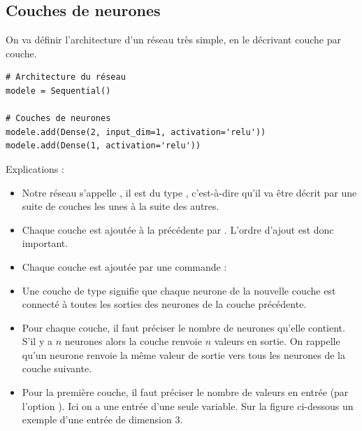 \documentclass[11pt,class=report,crop=false]{standalone}
\begin{document}
\subsection{Couches de neurones}
\label{ssec:couches}

On va définir l'architecture d'un réseau très simple, en le décrivant couche par couche.
\begin{lstlisting}
# Architecture du réseau
modele = Sequential()

# Couches de neurones
modele.add(Dense(2, input_dim=1, activation='relu'))
modele.add(Dense(1, activation='relu'))
\end{lstlisting} 

Explications :
\begin{itemize}
  \item Notre réseau s'appelle , il est du type , c'est-à-dire qu'il va être décrit par une suite de couches les unes à la suite des autres.
  
  \item Chaque couche est ajoutée à la précédente par .
  L'ordre d'ajout est donc important.
  
  \item Chaque couche est ajoutée par une commande :
  
  \item Une couche de type  signifie que chaque neurone de la nouvelle couche est connecté à toutes les sorties des neurones de la couche précédente.
  
 
  
  \item Pour chaque couche, il faut préciser le nombre de neurones qu'elle contient. S'il y a $n$ neurones alors la couche renvoie $n$ valeurs en sortie. On rappelle qu'un neurone renvoie la même valeur de sortie vers tous les neurones de la couche suivante.
  
  \item Pour la première couche, il faut préciser le nombre de valeurs en entrée (par l'option ). Ici on a une entrée d'une seule variable. Sur la figure ci-dessous un exemple d'une entrée de dimension $3$.


\end{itemize}
\end{document}
